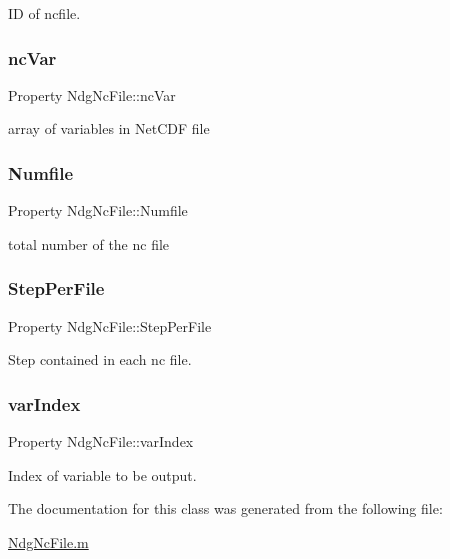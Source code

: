 ID of ncfile. 

\mbox{\label{class_ndg_nc_file_a5dcaad4c2124657ee1180dd6d4c226ab}} 
\subsubsection{\texorpdfstring{nc\+Var}{ncVar}}
{\footnotesize\ttfamily Property Ndg\+Nc\+File\+::nc\+Var\hspace{0.3cm}{\ttfamily [protected]}}



array of variables in Net\+C\+DF file 

\mbox{\label{class_ndg_nc_file_a2a6c2263de6f3888b2d375af4fa9b64b}} 
\subsubsection{\texorpdfstring{Numfile}{Numfile}}
{\footnotesize\ttfamily Property Ndg\+Nc\+File\+::\+Numfile}



total number of the nc file 

\mbox{\label{class_ndg_nc_file_a6fab01c746eec2c50d2e07b76a16cdbb}} 
\subsubsection{\texorpdfstring{Step\+Per\+File}{StepPerFile}}
{\footnotesize\ttfamily Property Ndg\+Nc\+File\+::\+Step\+Per\+File}



Step contained in each nc file. 

\mbox{\label{class_ndg_nc_file_a43947e80afdb0b619ec981785ddc21bc}} 
\subsubsection{\texorpdfstring{var\+Index}{varIndex}}
{\footnotesize\ttfamily Property Ndg\+Nc\+File\+::var\+Index}



Index of variable to be output. 



The documentation for this class was generated from the following file\+:\begin{DoxyCompactItemize}
\item 
\hyperlink{_ndg_nc_file_8m}{Ndg\+Nc\+File.\+m}\end{DoxyCompactItemize}
